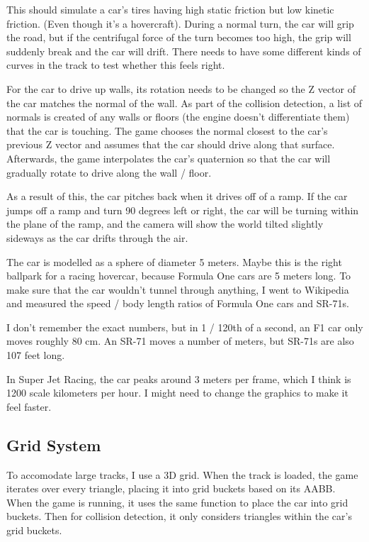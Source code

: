 \documentclass[]{book}
\begin{document}
This should simulate a car's tires having high static friction but low
kinetic friction. (Even though it's a hovercraft). During a normal turn,
the car will grip the road, but if the centrifugal force of the turn
becomes too high, the grip will suddenly break and the car will drift.
There needs to have some different kinds of curves in the track to test
whether this feels right.

For the car to drive up walls, its rotation needs to be changed so the Z
vector of the car matches the normal of the wall. As part of the
collision detection, a list of normals is created of any walls or floors
(the engine doesn't differentiate them) that the car is touching. The
game chooses the normal closest to the car's previous Z vector and
assumes that the car should drive along that surface. Afterwards, the
game interpolates the car's quaternion so that the car will gradually
rotate to drive along the wall / floor.

As a result of this, the car pitches back when it drives off of a ramp.
If the car jumps off a ramp and turn 90 degrees left or right, the car
will be turning within the plane of the ramp, and the camera will show
the world tilted slightly sideways as the car drifts through the air.

The car is modelled as a sphere of diameter 5 meters. Maybe this is the
right ballpark for a racing hovercar, because Formula One cars are 5
meters long. To make sure that the car wouldn't tunnel through anything,
I went to Wikipedia and measured the speed / body length ratios of
Formula One cars and SR-71s.

I don't remember the exact numbers, but in 1 / 120th of a second, an F1
car only moves roughly 80 cm. An SR-71 moves a number of meters, but
SR-71s are also 107 feet long.

In Super Jet Racing, the car peaks around 3 meters per frame, which I
think is 1200 scale kilometers per hour. I might need to change the
graphics to make it feel faster.

\subsection{Grid System}\label{grid-system}

To accomodate large tracks, I use a 3D grid. When the track is loaded,
the game iterates over every triangle, placing it into grid buckets
based on its AABB. When the game is running, it uses the same function
to place the car into grid buckets. Then for collision detection, it
only considers triangles within the car's grid buckets.
\end{document}
